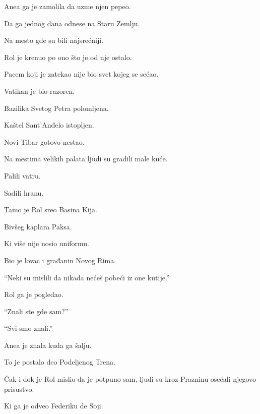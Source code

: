 Anea ga je zamolila da uzme njen pepeo.

Da ga jednog dana odnese na Staru Zemlju.

\bigskip

Na mesto gde su bili najsrećniji.

\bigskip

Rol je krenuo po ono što je od nje ostalo.

\bigskip

Pacem koji je zatekao nije bio svet kojeg se sećao.

\bigskip

Vatikan je bio razoren.

\bigskip

Bazilika Svetog Petra polomljena.

Kaštel Sant'Anđelo istopljen.

Novi Tibar gotovo nestao.

\bigskip

Na mestima velikih palata ljudi su gradili male kuće.

Palili vatru.

Sadili hranu.

\bigskip

Tamo je Rol sreo Basina Kija.

\bigskip

Bivšeg kaplara Paksa.

\bigskip

Ki više nije nosio uniformu.

Bio je lovac i građanin Novog Rima.

\bigskip

``Neki su mislili da nikada nećeš pobeći iz one kutije.''

\bigskip

Rol ga je pogledao.

``Znali ste gde sam?''

\bigskip

``Svi smo znali.''

\bigskip

Anea je znala kuda ga šalju.

To je postalo deo Podeljenog Trena.

\bigskip

Čak i dok je Rol mislio da je potpuno sam, ljudi su kroz Prazninu osećali njegovo prisustvo.

\bigskip

Ki ga je odveo Federiku de Soji.

\bigskip

